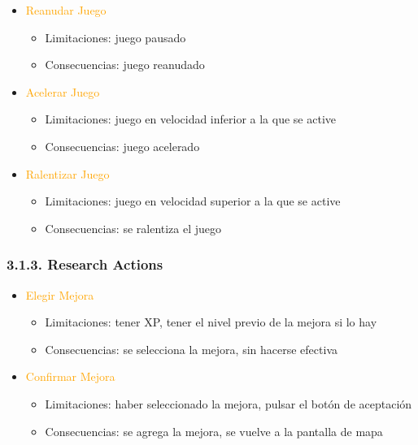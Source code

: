 \documentclass{article}
\begin{document}
\begin{itemize}
    \item \textcolor{Orange}{Reanudar Juego}
    \begin{itemize}
        \item Limitaciones:  juego pausado
        \item Consecuencias: juego reanudado
    \end{itemize}
\end{itemize}

\begin{itemize}
    \item \textcolor{Orange}{Acelerar Juego}
    \begin{itemize}
        \item Limitaciones: juego en velocidad inferior a la que se active
        \item Consecuencias: juego acelerado
    \end{itemize}
\end{itemize}

\begin{itemize}
    \item \textcolor{Orange}{Ralentizar Juego}
    \begin{itemize}
        \item Limitaciones:  juego en velocidad superior a la que se active
        \item Consecuencias: se ralentiza el juego
    \end{itemize}
\end{itemize}

\subsubsection{3.1.3. Research Actions}

\begin{itemize}
    \item \textcolor{Orange}{Elegir Mejora}
    \begin{itemize}
        \item Limitaciones: tener XP, tener el nivel previo de la mejora si lo hay
        \item Consecuencias: se selecciona la mejora, sin hacerse efectiva 
    \end{itemize}
\end{itemize}

\begin{itemize}
    \item \textcolor{Orange}{Confirmar Mejora}
    \begin{itemize}
        \item Limitaciones: haber seleccionado la mejora, pulsar el botón de aceptación
        \item Consecuencias: se agrega la mejora, se vuelve a la pantalla de mapa
    \end{itemize}
\end{itemize}
\end{document}
